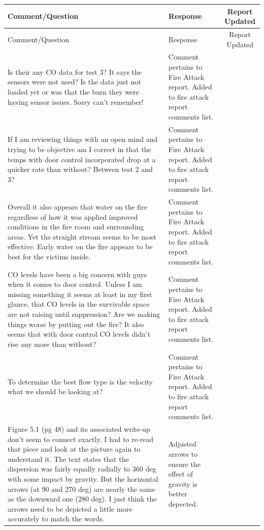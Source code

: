 \documentclass[12pt,oneside]{book}
\begin{document}
\begin{longtable}{|L{2.6in}|L{2.6in}|c|}

		\toprule[1.5pt]
		Comment/Question & Response & Report Updated \\ 
		\toprule[1.5pt] \endfirsthead
		\toprule[1.5pt]
		Comment/Question & Response & Report Updated \\ 
		\toprule[1.5pt] \endhead
		\midrule
		Is their any CO data for test 3? It says the sensors were not used? Is the data just not loaded yet or was that the burn they were having sensor issues. Sorry can't remember! &
		Comment pertains to Fire Attack report. Added to fire attack report comments list. & \\
		
		\hline
		If I am reviewing things with an open mind and trying to be objective am I correct in that the temps with door control incorporated drop at a quicker rate than without? Between test 2 and 3? & 
		Comment pertains to Fire Attack report. Added to fire attack report comments list. & \\

		\hline
		Overall it also appears that water on the fire regardless of how it was applied improved conditions in the fire room and surrounding areas. Yet the straight stream seems to be most effective. Early water on the fire appears to be best for the victims inside. &
		Comment pertains to Fire Attack report. Added to fire attack report comments list. & \\

		\hline
		CO levels have been a big concern with guys when it comes to door control. Unless I am missing something it seems at least in my first glance, that CO levels in the survivable space are not raising until suppression? Are we making things worse by putting out the fire? It also seems that with door control CO levels didn't rise any more than without? & 
		Comment pertains to Fire Attack report. Added to fire attack report comments list. & \\

		\hline
		To determine the best flow type is the velocity what we should be looking at? & 
		Comment pertains to Fire Attack report. Added to fire attack report comments list. & \\

		\hline
		Figure 5.1 (pg 48) and its associated write-up don't seem to connect exactly. I had to re-read that piece and look at the picture again to understand it. The text states that the dispersion was fairly equally radially to 360 deg with some impact by gravity. But the horizontal arrows (at 90 and 270 deg) are nearly the same as the downward one (280 deg). I just think the arrows need to be depicted a little more accurately to match the words. & 
		Adjusted arrows to ensure the effect of gravity is better depected. & \checkmark \\  


\end{longtable}
\end{document}
